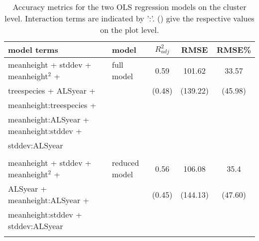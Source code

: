 \begin{table*}[!htbp]
	\begin{center}
	\caption{Accuracy metrics for the two OLS regression models on the cluster level. Interaction terms are indicated by ':'. () give the respective values on the plot level.} 
	\label{tab:modacc_modterms}
    {\small %
	\begin{tabular}{llccc}
  \hline
model terms & model & $R^2_{adj}$ & RMSE & RMSE\% \\ 
  \hline \hline
meanheight + stddev + meanheight$^2$ +  & full model &  0.59 & 101.62  & 33.57 \\
treespecies + ALSyear + & & (0.48) &  (139.22) & (45.98) \\ 
meanheight:treespecies + \\ meanheight:ALSyear + meanheight:stddev + \\ stddev:ALSyear &&& \\ \\

meanheight + stddev + meanheight$^2$ + & reduced model  & 0.56  & 106.08 & 35.4 \\
ALSyear + meanheight:ALSyear + & & (0.45) & (144.13) & (47.60) \\
meanheight:stddev + stddev:ALSyear &&& \\ \\
\hline
\hline
\end{tabular}
}%
\end{center}
\end{table*}

